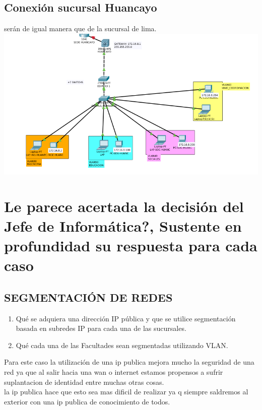 \subsection{Conexi\'on sucursal Huancayo}
ser\'an de igual manera que de la sucursal de lima.
\\
\includegraphics[scale=0.45]{img/VLANHUANCAYO.png} 


\section{\¿Le parece acertada la decisi\'on del Jefe de Inform\'atica?, Sustente en profundidad su respuesta para cada caso}
\subsection{SEGMENTACI\'ON DE REDES}
\begin{definicion}[]
{
\begin{enumerate}[label=\itembolasazules{}]
\item Qu\'e se adquiera una direcci\'on IP p\'ublica y que se utilice
segmentaci\'on basada en subredes IP para cada una de las sucursales.
\item Qu\'e cada una de las Facultades sean segmentadas utilizando VLAN.
\end{enumerate}
}
\end{definicion}
Para este caso la utilizaci\'on de una ip publica mejora mucho la seguridad de una red ya que al salir hacia una wan o internet estamos propensos a sufrir suplantacion de identidad entre muchas otras cosas.
\\
la ip publica hace que esto sea mas dificil de realizar ya q siempre saldremos al exterior con una ip publica de conocimiento de todos.\\

